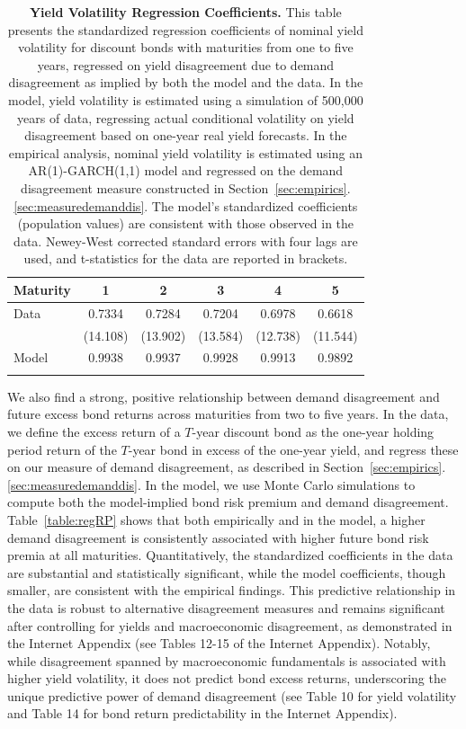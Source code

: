 \documentclass[preprint,11pt,authoryear]{elsarticle}
\theoremstyle{plain}
\begin{document}
\begin{table}[h!]
\centering
\begin{tabular}{lccccc}
\toprule
\textbf{Maturity} & \textbf{1} & \textbf{2} & \textbf{3} & \textbf{4} & \textbf{5} \\ 
\midrule
Data   & 0.7334 & 0.7284 & 0.7204 & 0.6978  & 0.6618 \\ 
    & (14.108) & (13.902) & (13.584) & (12.738) & (11.544) \\ 
\midrule
Model  & 0.9938 & 0.9937 & 0.9928 & 0.9913 & 0.9892 \\ 
\bottomrule
& & & & & \\
\end{tabular}
\caption{\textbf{Yield Volatility Regression Coefficients.} This table presents the standardized regression coefficients of nominal yield volatility for discount bonds with maturities from one to five years, regressed on yield disagreement due to demand disagreement as implied by both the model and the data. In the model, yield volatility is estimated using a simulation of 500,000 years of data, regressing actual conditional volatility on yield disagreement based on one-year real yield forecasts. In the empirical analysis, nominal yield volatility is estimated using an AR(1)-GARCH(1,1) model and regressed on the demand disagreement measure constructed in Section~\ref{sec:empirics}.\ref{sec:measuredemanddis}. The model's standardized coefficients (population values) are consistent with those observed in the data. Newey-West corrected standard errors with four lags are used, and t-statistics for the data are reported in brackets.}
\label{table:regvola}
\end{table}

We also find a strong, positive relationship between demand disagreement and future excess bond returns across maturities from two to five years. In the data, we define the excess return of a $T$-year discount bond as the one-year holding period return of the $T$-year bond in excess of the one-year yield, and regress these on our measure of demand disagreement, as described in Section~\ref{sec:empirics}.\ref{sec:measuredemanddis}. In the model, we use Monte Carlo simulations to compute both the model-implied bond risk premium and demand disagreement. Table~\ref{table:regRP} shows that both empirically and in the model, a higher demand disagreement is consistently associated with higher future bond risk premia at all maturities. Quantitatively, the standardized coefficients in the data are substantial and statistically significant, while the model coefficients, though smaller, are consistent with the empirical findings. This predictive relationship in the data is robust to alternative disagreement measures and remains significant after controlling for yields and macroeconomic disagreement, as demonstrated in the Internet Appendix (see Tables 12-15 of the Internet Appendix). Notably, while disagreement spanned by macroeconomic fundamentals is associated with higher yield volatility, it does not predict bond excess returns, underscoring the unique predictive power of demand disagreement (see Table 10 for yield volatility and Table 14 for bond return predictability in the Internet Appendix).
\end{document}
